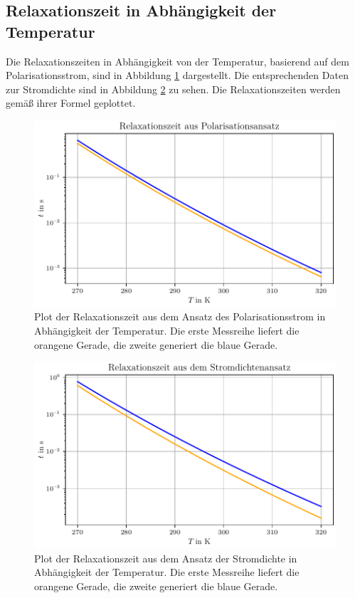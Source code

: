 \subsection{Relaxationszeit in Abhängigkeit der Temperatur}
Die Relaxationszeiten in Abhängigkeit von der Temperatur, basierend auf dem Polarisationsstrom,
sind in Abbildung \ref{fig:Relaxationszeit_p} dargestellt. Die entsprechenden Daten zur Stromdichte sind in Abbildung \ref{fig:Relaxationszeit_j} zu sehen.
Die Relaxationszeiten werden gemäß ihrer Formel geplottet.

\begin{figure}[H]
    \centering
    \includegraphics[width=\textwidth]{plots/I_relaxationszeit_polarisation.pdf}
    \caption{Plot der Relaxationszeit aus dem Ansatz des Polarisationsstrom in Abhängigkeit der Temperatur.
    Die erste Messreihe liefert die orangene Gerade, die zweite generiert die blaue Gerade.}
    \label{fig:Relaxationszeit_p}
\end{figure}

\begin{figure}[H]
    \centering
    \includegraphics[width=\textwidth]{plots/J_relaxationszeit_stromdichte.pdf}
    \caption{Plot der Relaxationszeit aus dem Ansatz der Stromdichte in Abhängigkeit der Temperatur.
    Die erste Messreihe liefert die orangene Gerade, die zweite generiert die blaue Gerade.}
    \label{fig:Relaxationszeit_j}
\end{figure}